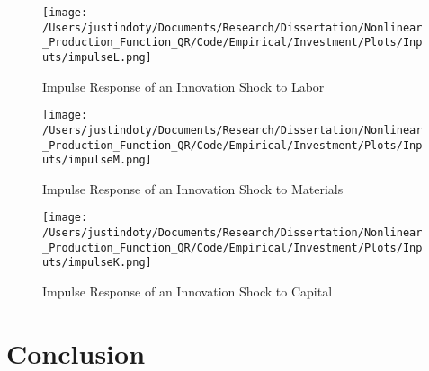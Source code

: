 \documentclass{article}
\begin{document}
\begin{figure}[H]
\centering
\caption{Impulse Response of an Innovation Shock to Labor}
\texttt{[image: /Users/justindoty/Documents/Research/Dissertation/Nonlinear\_Production\_Function\_QR/Code/Empirical/Investment/Plots/Inputs/impulseL.png]}
\label{impulseL}
\end{figure}

\begin{figure}[H]
\centering
\caption{Impulse Response of an Innovation Shock to Materials}
\texttt{[image: /Users/justindoty/Documents/Research/Dissertation/Nonlinear\_Production\_Function\_QR/Code/Empirical/Investment/Plots/Inputs/impulseM.png]}
\label{impulseM}
\end{figure}

\begin{figure}[H]
\centering
\caption{Impulse Response of an Innovation Shock to Capital}
\texttt{[image: /Users/justindoty/Documents/Research/Dissertation/Nonlinear\_Production\_Function\_QR/Code/Empirical/Investment/Plots/Inputs/impulseK.png]}
\label{impulseK}
\end{figure}

\section{Conclusion} \label{conclusion}


\pagebreak
\newpage



\pagebreak
\newpage

\appendix

                                          
\end{document}
